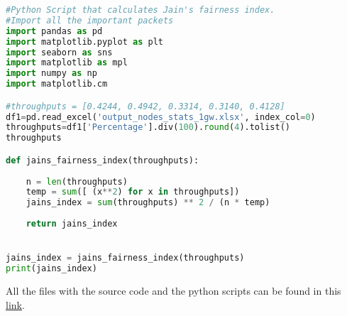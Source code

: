 \begin{lstlisting}[language=Python, caption = Python Script that calculates Jain's fairness index, label=lst:jindex]
#Python Script that calculates Jain's fairness index.
#Import all the important packets
import pandas as pd 
import matplotlib.pyplot as plt 
import seaborn as sns
import matplotlib as mpl
import numpy as np
import matplotlib.cm

#throughputs = [0.4244, 0.4942, 0.3314, 0.3140, 0.4128]
df1=pd.read_excel('output_nodes_stats_1gw.xlsx', index_col=0)
throughputs=df1['Percentage'].div(100).round(4).tolist()
throughputs

def jains_fairness_index(throughputs):
        
    n = len(throughputs)
    temp = sum([ (x**2) for x in throughputs])
    jains_index = sum(throughputs) ** 2 / (n * temp)
 
    return jains_index


jains_index = jains_fairness_index(throughputs)
print(jains_index)
\end{lstlisting}


All the files with the source code and the python scripts can be found in this \href{https://github.com/memorial4/LoRa_Mobility}{link}.


